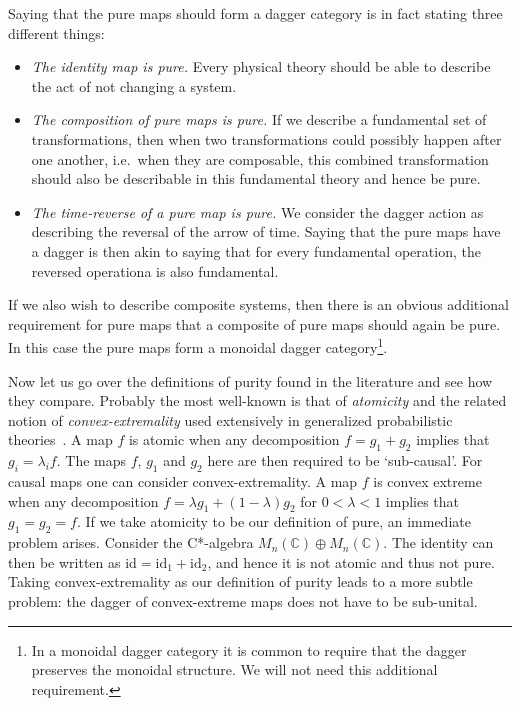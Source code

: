 \documentclass[a4paper,onecolumn,10pt,accepted=2019-05-03, issue=1, volume=1, shorttitle=papers/compositionality-1-1]{compositionalityarticle}
\numberwithin{counter}{section}
\newcommand{\C}{\mathbb{C}}
\newcommand{\id}{\text{id}}
\begin{document}
Saying that the pure maps should form a dagger category is in fact stating three different things:
\begin{itemize}
    \item \emph{The identity map is pure.} Every physical theory should be able to describe the act of not changing a system.
    \item \emph{The composition of pure maps is pure.} If we describe a fundamental set of transformations, then when two transformations could possibly happen after one another, i.e.\ when they are composable, this combined transformation should also be describable in this fundamental theory and hence be pure.
    \item \emph{The time-reverse of a pure map is pure.} We consider the dagger action as describing the reversal of the arrow of time. Saying that the pure maps have a dagger is then akin to saying that for every fundamental operation, the reversed operationa is also fundamental.
\end{itemize}

If we also wish to describe composite systems, then there is an obvious additional requirement for pure maps that a composite of pure maps should again be pure. In this case the pure maps form a monoidal dagger category\footnote{In a monoidal dagger category it is common to require that the dagger preserves the monoidal structure. We will not need this additional requirement.}.

Now let us go over the definitions of purity found in the literature and see how they compare. 
Probably the most well-known is that of \emph{atomicity} and the related notion of \emph{convex-extremality} used extensively in generalized probabilistic theories~\cite{barrett2007information,chiribella2010probabilistic,chiribella2011informational}. A map $f$ is atomic when any decomposition $f=g_1+g_2$ implies that $g_i = \lambda_i f$. The maps $f$, $g_1$ and $g_2$ here are then required to be `sub-causal'. For causal maps one can consider convex-extremality. A map $f$ is convex extreme when any decomposition $f=\lambda g_1 + (1-\lambda)g_2$ for $0<\lambda<1$ implies that $g_1=g_2=f$. If we take atomicity to be our definition of pure, an immediate problem arises. Consider the C*-algebra $M_n(\C)\oplus M_n(\C)$. The identity can then be written as $\id = \id_1+\id_2$, and hence it is not atomic and thus not pure. Taking convex-extremality as our definition of purity leads to a more subtle problem: the dagger of convex-extreme maps does not have to be sub-unital.
\end{document}
